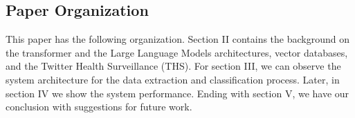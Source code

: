 \subsection{Paper Organization}
This paper has the following organization. Section II contains the background on the transformer and the Large Language Models architectures, vector databases, and the Twitter Health Surveillance (THS). For section III, we can observe the system architecture for the data extraction and classification process. Later, in section IV we show the system performance. Ending with section V, we have our conclusion with suggestions for future work.
